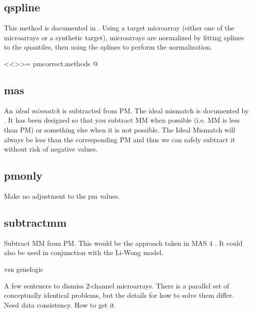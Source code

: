 \subsection{qspline}
This method is documented in \cite{workman:etal:2002}. Using a target microarray (either one of the microarrays or a synthetic target), microarrays are normalized by fitting splines to the quantiles, then using the splines to perform the normalization.

<<>>=
pmcorrect.methods
@
\subsection{mas}

An \emph{ideal mismatch} is subtracted from PM. The ideal mismatch is documented by \cite{affy:tech:2002}. It has been designed so that you subtract MM when possible (i.e. MM is less than PM) or something else when it is not possible. The Ideal Mismatch will always be less than the corresponding PM and thus we can safely subtract it without risk of negative values.

\subsection{pmonly}

Make no adjustment to the pm values.

\subsection{subtractmm}

Subtract MM from PM. This would be the approach taken in MAS 4 \cite{affy4}. It could also be used in conjunction with the Li-Wong model.

vsn			\cite{vsn}
genelogic		\cite{genelogic}

A few sentences to dismiss 2-channel microarrays.  There is a parallel set of conceptually identical problems, but the details for how to solve them differ.
Need data consistency.  How to get it

